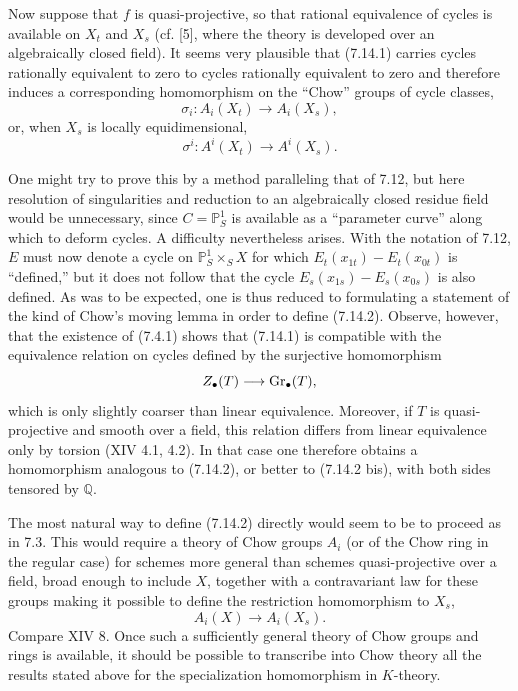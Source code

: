 Now suppose that $f$ is quasi-projective, so that rational equivalence of
cycles is available on $X_t$ and $X_s$ (cf. [5], where the theory is
developed over an algebraically closed field). It seems very plausible that
(7.14.1) carries cycles rationally equivalent to zero to cycles rationally
equivalent to zero and therefore induces a corresponding homomorphism on the
``Chow'' groups of cycle classes,
\begin{equation}\tag{7.14.2}
\sigma_i:A_i(X_t)\longrightarrow A_i(X_s),
\end{equation}
or, when $X_s$ is locally equidimensional,
\begin{equation}\tag{7.14.2 bis}
\sigma^i:A^i(X_t)\longrightarrow A^i(X_s).
\end{equation}

One might try to prove this by a method paralleling that of 7.12, but here
resolution of singularities and reduction
to an algebraically closed residue field would be unnecessary, since
$C=\mathbb P^1_S$ is available as a
``parameter curve'' along which to deform cycles. A difficulty nevertheless
arises. With the notation of 7.12, $E$ must now denote a cycle on
$\mathbb P^1_S\times_SX$ for which
$E_t(x_{1t})-E_t(x_{0t})$ is ``defined,'' but it does not follow that the
cycle $E_s(x_{1s})-E_s(x_{0s})$ is also defined. As was to be expected, one
is thus reduced to formulating a statement of the kind of Chow's moving
lemma in order to define (7.14.2).
Observe, however, that the existence of (7.4.1) shows that (7.14.1) is
compatible with the equivalence relation on cycles defined by the surjective
homomorphism
\[
Z_\bullet(T)\longrightarrow\operatorname{Gr}_\bullet(T),
\]
which is only slightly coarser than linear equivalence. Moreover, if $T$ is
quasi-projective and smooth over a field, this relation differs from linear
equivalence only by torsion (XIV 4.1, 4.2). In that case one therefore obtains
a homomorphism analogous to (7.14.2), or better to (7.14.2 bis), with both
sides tensored by $\mathbb Q$.

The most natural way to define (7.14.2) directly would seem to be to proceed
as in 7.3. This would require a theory of Chow groups $A_i$ (or of the Chow
ring in the regular case) for schemes more general than schemes
quasi-projective over a field, broad enough to include $X$, together with a
contravariant law for these groups making it possible to define the
restriction homomorphism to $X_s$,
\[
A_i(X)\longrightarrow A_i(X_s).
\]
Compare XIV 8. Once such a sufficiently general theory of Chow groups and
rings is available, it should be possible to transcribe into Chow theory all
the results stated above for the specialization homomorphism in $K$-theory.

